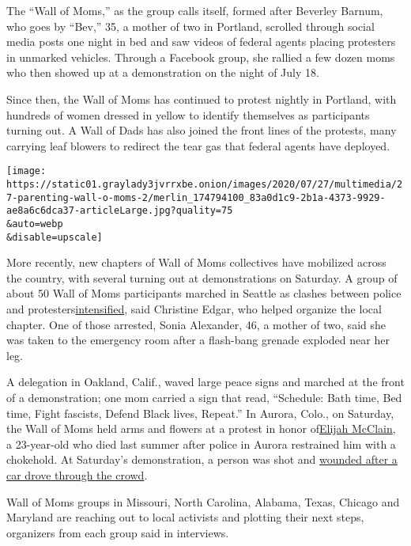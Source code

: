 The ``Wall of Moms,'' as the group calls itself, formed after Beverley
Barnum, who goes by ``Bev,'' 35, a mother of two in Portland, scrolled
through social media posts one night in bed and saw videos of federal
agents placing protesters in unmarked vehicles. Through a Facebook
group, she rallied a few dozen moms who then showed up at a
demonstration on the night of July 18.

Since then, the Wall of Moms has continued to protest nightly in
Portland, with hundreds of women dressed in yellow to identify
themselves as participants turning out. A Wall of Dads has also joined
the front lines of the protests, many carrying leaf blowers to redirect
the tear gas that federal agents have deployed.

\texttt{[image: https://static01.graylady3jvrrxbe.onion/images/2020/07/27/multimedia/27-parenting-wall-o-moms-2/merlin\_174794100\_83a0d1c9-2b1a-4373-9929-ae8a6c6dca37-articleLarge.jpg?quality=75\\\&auto=webp\\\&disable=upscale]}

More recently, new chapters of Wall of Moms collectives have mobilized
across the country, with several turning out at demonstrations on
Saturday. A group of about 50 Wall of Moms participants marched in
Seattle as clashes between police and
protesters\href{https://www.nytimes3xbfgragh.onion/2020/07/25/us/protests-seattle-portland.html}{intensified},
said Christine Edgar, who helped organize the local chapter. One of
those arrested, Sonia Alexander, 46, a mother of two, said she was taken
to the emergency room after a flash-bang grenade exploded near her leg.

A delegation in Oakland, Calif., waved large peace signs and marched at
the front of a demonstration; one mom carried a sign that read,
``Schedule: Bath time, Bed time, Fight fascists, Defend Black lives,
Repeat.'' In Aurora, Colo., on Saturday, the Wall of Moms held arms and
flowers at a protest in honor
of\href{https://www.nytimes3xbfgragh.onion/article/who-was-elijah-mcclain.html}{Elijah
McClain}, a 23-year-old who died last summer after police in Aurora
restrained him with a chokehold. At Saturday's demonstration, a person
was shot and
\href{https://www.denverpost.com/2020/07/25/elijah-mcclain-protest-aurora-saturday/}{wounded
after a car drove through the crowd}.

Wall of Moms groups in Missouri, North Carolina, Alabama, Texas, Chicago
and Maryland are reaching out to local activists and plotting their next
steps, organizers from each group said in interviews.

